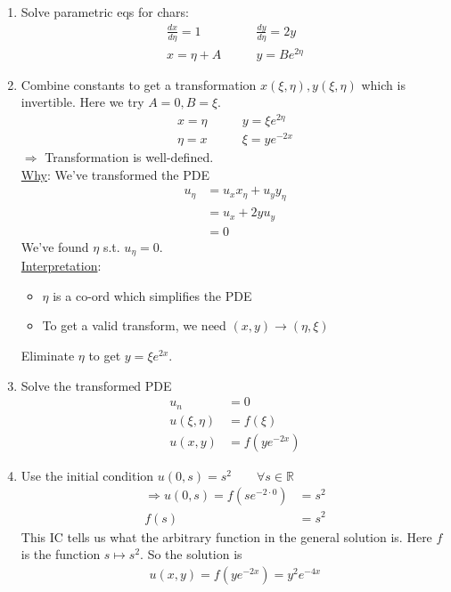 \documentclass[12pt, letterpaper]{article}
\begin{document}
\begin{enumerate}
    \item Solve parametric eqs for chars:
    \begin{align*}
        \frac{dx}{d\eta} = 1 &\qquad \frac{dy}{d\eta} = 2y \\
        x = \eta + A &\qquad y = Be^{2\eta}
    \end{align*}
    \item Combine constants to get a transformation $x(\xi, \eta), y(\xi,\eta)$ which is 
    invertible. Here we try $A = 0, B = \xi$.
    \begin{align*}
        x = \eta &\qquad y = \xi e^{2\eta} \\
        \eta = x &\qquad \xi = ye^{-2x}
    \end{align*}
    $\Rightarrow$ Transformation is well-defined. \\
    \underline{Why}: We've transformed the PDE 
    \begin{align*}
        u_\eta &= u_x x_\eta + u_y y_\eta \\
        &= u_x + 2yu_y \\
        &= 0
    \end{align*}
    We've found $\eta$ s.t. $u_\eta = 0$. \\
    \underline{Interpretation}:
    \begin{itemize}
        \item $\eta$ is a co-ord which simplifies the PDE 
        \item To get a valid transform, we need $(x,y)\rightarrow (\eta,\xi)$
    \end{itemize}
    Eliminate $\eta$ to get $y = \xi e^{2x}$.
    \item Solve the transformed PDE
    \begin{align*}
        u_n &= 0 \\
        u(\xi, \eta) &= f(\xi) \\
        u(x,y) &= f(ye^{-2x})
    \end{align*}
    \item Use the initial condition $u(0,s) = s^2 \qquad \forall s \in \mathbb{R}$
    \begin{align*}
        \Rightarrow u(0,s) = f(se^{-2\cdot 0}) &= s^2 \\
        f(s) &= s^2
    \end{align*}
    This IC tells us what the arbitrary function in the general solution is. Here $f$ is the 
    function $s \mapsto s^2$. So the solution is 
    \begin{align*}
        u(x,y) = f(ye^{-2x}) = y^2e^{-4x}
    \end{align*}
\end{enumerate}
\end{document}
